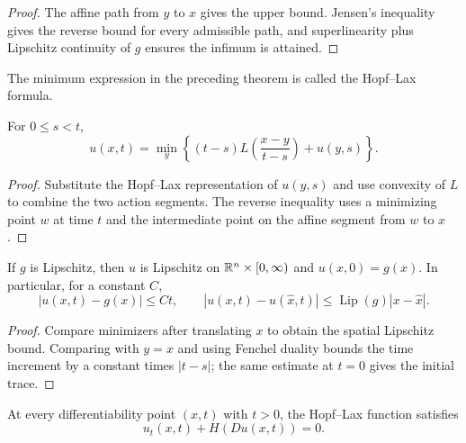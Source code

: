 \begin{proof}
\sketch The affine path from $y$ to $x$ gives the upper bound. Jensen's
inequality gives the reverse bound for every admissible path, and
superlinearity plus Lipschitz continuity of $g$ ensures the infimum is
attained.
\end{proof}

\begin{definition}
\label{def:hopf-lax-formula}

The minimum expression in the preceding theorem is called the Hopf--Lax
formula.
\end{definition}

\begin{lemma}
\label{lem:hopf-lax-functional-identity}

For $0\le s<t$,
\[
u(x,t)=\min_y\left\{(t-s)L\left(\frac{x-y}{t-s}\right)+u(y,s)\right\}.
\]
\end{lemma}

\begin{proof}
\sketch Substitute the Hopf--Lax representation of $u(y,s)$ and use
convexity of $L$ to combine the two action segments. The reverse inequality
uses a minimizing point $w$ at time $t$ and the intermediate point on the
affine segment from $w$ to $x$.
\end{proof}

\begin{lemma}
\label{lem:hopf-lax-lipschitz-continuity}

If $g$ is Lipschitz, then $u$ is Lipschitz on $\mathbb{R}^n\times[0,\infty)$ and
$u(x,0)=g(x)$. In particular, for a constant $C$,
\[
|u(x,t)-g(x)|\le Ct,\qquad
|u(x,t)-u(\hat x,t)|\le \operatorname{Lip}(g)|x-\hat x|.
\]
\end{lemma}

\begin{proof}
\sketch Compare minimizers after translating $x$ to obtain the spatial
Lipschitz bound. Comparing with $y=x$ and using Fenchel duality bounds the
time increment by a constant times $|t-s|$; the same estimate at $t=0$ gives
the initial trace.
\end{proof}

\begin{theorem}
\label{thm:hopf-lax-solves-hj-equation}

At every differentiability point $(x,t)$ with $t>0$, the Hopf--Lax function
satisfies
\[
u_t(x,t)+H(Du(x,t))=0.
\]
\end{theorem}

